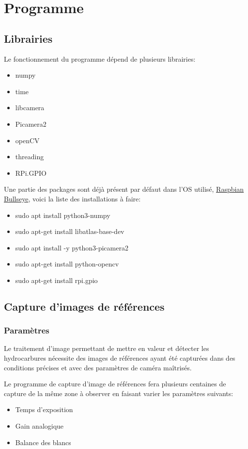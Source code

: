 \section{Programme}
\subsection{Librairies}
Le fonctionnement du programme dépend de plusieurs librairies:
\begin{itemize}
    \item numpy
    \item time
    \item libcamera
    \item Picamera2
    \item openCV
    \item threading
    \item RPi.GPIO
\end{itemize}
Une partie des packages sont déjà présent par défaut dans l'OS utilisé, \underline{Raspbian Bullseye}, voici la liste des installations à faire:
\begin{itemize}
    \item sudo apt install python3-numpy
    \item sudo apt-get install libatlas-base-dev
    \item sudo apt install -y python3-picamera2
    \item sudo apt-get install python-opencv
    \item sudo apt-get install rpi.gpio
\end{itemize}
\subsection{Capture d'images de références}
\subsubsection{Paramètres}
Le traitement d'image permettant de mettre en valeur et détecter les hydrocarbures nécessite des images de références ayant été capturées dans des conditions précises et avec des paramètres de caméra maîtrisés.

Le programme de capture d'image de références fera plusieurs centaines de capture de la même zone à observer en faisant varier les paramètres suivants:
\begin{itemize}
    \item Temps d'exposition
    \item Gain analogique
    \item Balance des blancs
\end{itemize}

